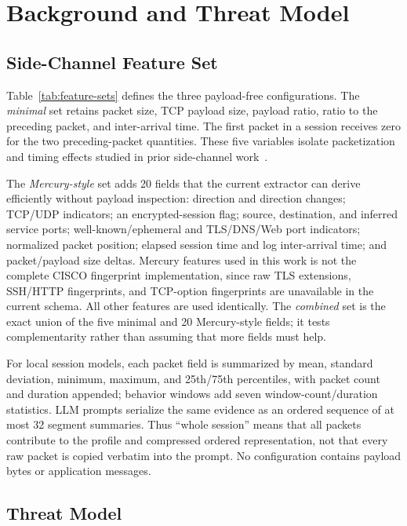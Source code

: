 \documentclass[letterpaper,twocolumn,10pt]{article}
\begin{document}
\section{Background and Threat Model}
\label{sec:background}


\subsection{Side-Channel Feature Set}

Table~\ref{tab:feature-sets} defines the three payload-free configurations. The \emph{minimal} set retains packet size, TCP payload size, payload ratio, ratio to the preceding packet, and inter-arrival time. The first packet in a session receives zero for the two preceding-packet quantities. These five variables isolate packetization and timing effects studied in prior side-channel work~\cite{stergiopoulos2018side,chen2010sidechannel,chen2019robust,sharafaldin2018toward}.

The \emph{Mercury-style} set adds 20 fields that the current extractor can derive efficiently without payload inspection: direction and direction changes; TCP/UDP indicators; an encrypted-session flag; source, destination, and inferred service ports; well-known/ephemeral and TLS/DNS/Web port indicators; normalized packet position; elapsed session time and log inter-arrival time; and packet/payload size deltas. Mercury features used in this work is not the complete CISCO fingerprint implementation, since raw TLS extensions, SSH/HTTP fingerprints, and TCP-option fingerprints are unavailable in the current schema. All other features are used identically. The \emph{combined} set is the exact union of the five minimal and 20 Mercury-style fields; it tests complementarity rather than assuming that more fields must help.

For local session models, each packet field is summarized by mean, standard deviation, minimum, maximum, and 25th/75th percentiles, with packet count and duration appended; behavior windows add seven window-count/duration statistics. LLM prompts serialize the same evidence as an ordered sequence of at most 32 segment summaries. Thus ``whole session'' means that all packets contribute to the profile and compressed ordered representation, not that every raw packet is copied verbatim into the prompt. No configuration contains payload bytes or application messages.


\subsection{Threat Model}
\end{document}
